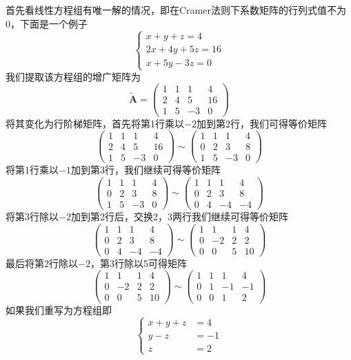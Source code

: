 首先看线性方程组有唯一解的情况，即在Cramer法则下系数矩阵的行列式值不为0，下面是一个例子$$\left\{\begin{matrix} 
	x+y+z=4 \\  
	2x+4y+5z=16 \\
	x+5y-3z=0
\end{matrix}\right. $$我们提取该方程组的增广矩阵为$$\tilde{\mathbf{A}}=\begin{pmatrix}
	1 & 1 & 1 & 4\\
	2 & 4 & 5 & 16\\
	1 & 5 & -3 & 0
\end{pmatrix}$$将其变化为行阶梯矩阵，首先将第1行乘以$-2$加到第2行，我们可得等价矩阵$$\begin{pmatrix}
	1 & 1 & 1 & 4\\
	2 & 4 & 5 & 16\\
	1 & 5 & -3 & 0
\end{pmatrix}\sim \begin{pmatrix}
	1 & 1 & 1 & 4\\
	0 & 2 & 3 & 8\\
	1 & 5 & -3 & 0
\end{pmatrix}$$将第1行乘以$-1$加到第3行，我们继续可得等价矩阵$$\begin{pmatrix}
	1 & 1 & 1 & 4\\
	0 & 2 & 3 & 8\\
	1 & 5 & -3 & 0
\end{pmatrix}\sim \begin{pmatrix}
	1 & 1 & 1 & 4\\
	0 & 2 & 3 & 8\\
	0 & 4 & -4 & -4
\end{pmatrix}$$将第3行除以$-2$加到第2行后，交换2，3两行我们继续可得等价矩阵$$\begin{pmatrix}
	1 & 1 & 1 & 4\\
	0 & 2 & 3 & 8\\
	0 & 4 & -4 & -4
\end{pmatrix}\sim \begin{pmatrix}
	1 & 1 & 1 & 4\\
	0 & -2 & 2 & 2\\
	0 & 0 & 5 & 10
\end{pmatrix}$$最后将第2行除以$-2$，第3行除以5可得矩阵$$\begin{pmatrix}
	1 & 1 & 1 & 4\\
	0 & -2 & 2 & 2\\
	0 & 0 & 5 & 10
\end{pmatrix}\sim \begin{pmatrix}
	1 & 1 & 1 & 4\\
	0 & 1 & -1 & -1\\
	0 & 0 & 1 & 2
\end{pmatrix}$$如果我们重写为方程组即$$\left\{\begin{aligned} 
	x+y+z&=4 \\  
	y-z&=-1\\
	z&=2
\end{aligned}\right. $$

